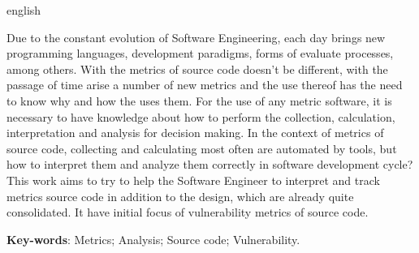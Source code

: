 \begin{resumo}[Abstract]
 \begin{otherlanguage*}{english}

   Due to the constant evolution of Software Engineering, each day brings
   new programming languages, development paradigms, forms of
   evaluate processes, among others. With the metrics of source code doesn't
   be different, with the passage of time arise a number of new metrics and
   the use thereof has the need to know why and how the
   uses them. For the use of any metric software,
   it is necessary to have knowledge about how to perform the collection, calculation,
   interpretation and analysis for decision making. In the context of metrics of
   source code, collecting and calculating most often are automated by
   tools, but how to interpret them and analyze them correctly in
   software development cycle? This work aims to try to
   help the Software Engineer to interpret and track metrics
   source code in addition to the design, which are already quite consolidated. It have
   initial focus of vulnerability metrics of source code.

   \vspace{\onelineskip}
 
   \noindent 
   \textbf{Key-words}: Metrics; Analysis; Source code; Vulnerability.
 \end{otherlanguage*}
\end{resumo}

